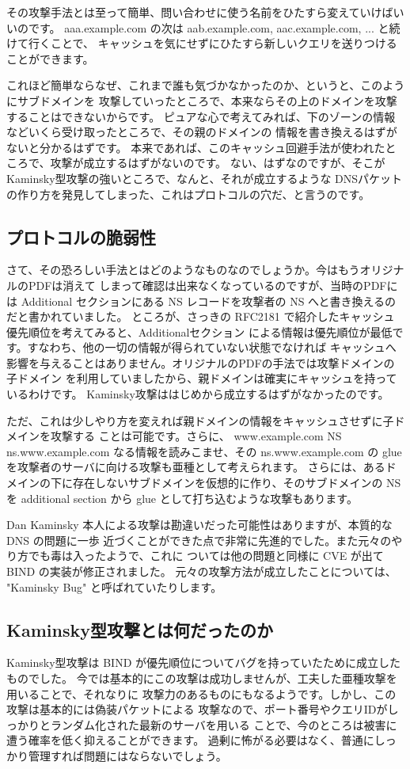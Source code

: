 その攻撃手法とは至って簡単、問い合わせに使う名前をひたすら変えていけばいいのです。
aaa.example.com の次は aab.example.com, aac.example.com, ... と続けて行くことで、
キャッシュを気にせずにひたすら新しいクエリを送りつけることができます。

これほど簡単ならなぜ、これまで誰も気づかなかったのか、というと、このようにサブドメインを
攻撃していったところで、本来ならその上のドメインを攻撃することはできないからです。
ピュアな心で考えてみれば、下のゾーンの情報などいくら受け取ったところで、その親のドメインの
情報を書き換えるはずがないと分かるはずです。
本来であれば、このキャッシュ回避手法が使われたところで、攻撃が成立するはずがないのです。
ない、はずなのですが、そこがKaminsky型攻撃の強いところで、なんと、それが成立するような
DNSパケットの作り方を発見してしまった、これはプロトコルの穴だ、と言うのです。

\subsection{プロトコルの脆弱性}
さて、その恐ろしい手法とはどのようなものなのでしょうか。今はもうオリジナルのPDFは消えて
しまって確認は出来なくなっているのですが、当時のPDFには Additional セクションにある
NS レコードを攻撃者の NS へと書き換えるのだと書かれていました。
ところが、さっきの RFC2181 で紹介したキャッシュ優先順位を考えてみると、Additionalセクション
による情報は優先順位が最低です。すなわち、他の一切の情報が得られていない状態でなければ
キャッシュへ影響を与えることはありません。オリジナルのPDFの手法では攻撃ドメインの子ドメイン
を利用していましたから、親ドメインは確実にキャッシュを持っているわけです。
Kaminsky攻撃ははじめから成立するはずがなかったのです。

ただ、これは少しやり方を変えれば親ドメインの情報をキャッシュさせずに子ドメインを攻撃する
ことは可能です。さらに、 www.example.com NS ns.www.example.com なる情報を読みこませ、その
ns.www.example.com の glue を攻撃者のサーバに向ける攻撃も亜種として考えられます。
さらには、あるドメインの下に存在しないサブドメインを仮想的に作り、そのサブドメインの NS を
additional section から glue として打ち込むような攻撃もあります。

Dan Kaminsky 本人による攻撃は勘違いだった可能性はありますが、本質的な DNS の問題に一歩
近づくことができた点で非常に先進的でした。また元々のやり方でも毒は入ったようで、これに
ついては他の問題と同様に CVE が出て BIND の実装が修正されました。
元々の攻撃方法が成立したことについては、 "Kaminsky Bug" と呼ばれていたりします。

\subsection{Kaminsky型攻撃とは何だったのか}
Kaminsky型攻撃は BIND が優先順位についてバグを持っていたために成立したものでした。
今では基本的にこの攻撃は成功しませんが、工夫した亜種攻撃を用いることで、それなりに
攻撃力のあるものにもなるようです。しかし、この攻撃は基本的には偽装パケットによる
攻撃なので、ポート番号やクエリIDがしっかりとランダム化された最新のサーバを用いる
ことで、今のところは被害に遭う確率を低く抑えることができます。
過剰に怖がる必要はなく、普通にしっかり管理すれば問題にはならないでしょう。


